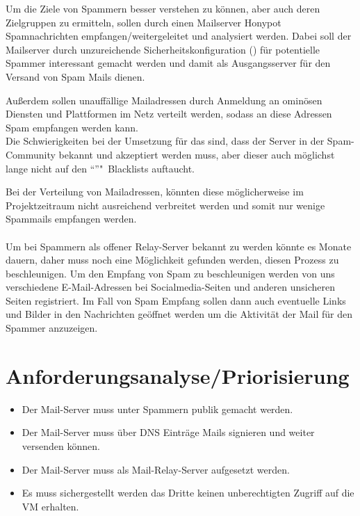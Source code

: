 \documentclass[a4paper,11pt,singlespacing]{article}
\begin{document}
	Um die Ziele von Spammern besser verstehen zu können, aber auch deren Zielgruppen zu ermitteln, sollen durch einen Mailserver Honypot Spamnachrichten empfangen/weitergeleitet und analysiert werden. 
	Dabei soll der Mailserver durch unzureichende Sicherheitskonfiguration () für potentielle Spammer interessant gemacht werden und damit als Ausgangsserver für den Versand von Spam Mails dienen.
	
	Außerdem sollen unauffällige Mailadressen durch Anmeldung an ominösen Diensten und Plattformen im Netz verteilt werden, sodass an diese Adressen Spam empfangen werden kann.
\\
	Die Schwierigkeiten bei der Umsetzung für das  sind, dass der Server in der Spam-Community bekannt und akzeptiert werden muss, aber dieser auch möglichst lange nicht auf den "`"'"~Blacklists auftaucht.
	
	Bei der Verteilung von Mailadressen, könnten diese möglicherweise im Projektzeitraum nicht ausreichend verbreitet werden und somit nur wenige Spammails empfangen werden.
\\\\
	Um bei Spammern als offener Relay-Server bekannt zu werden könnte es Monate dauern, daher muss noch eine Möglichkeit gefunden werden, diesen Prozess zu beschleunigen.
	Um den Empfang von Spam zu beschleunigen werden von uns verschiedene E-Mail-Adressen bei Socialmedia-Seiten und anderen unsicheren Seiten registriert.
	Im Fall von Spam Empfang sollen dann auch eventuelle Links und Bilder in den Nachrichten geöffnet werden um die Aktivität der Mail für den Spammer anzuzeigen.


\section{Anforderungsanalyse/Priorisierung}\label{sec:AnforderungsanalysePriorisierung}
	\begin{itemize}
	\item Der Mail-Server muss unter Spammern publik gemacht werden.
	\item Der Mail-Server muss über DNS Einträge Mails signieren und weiter versenden können.
	\item Der Mail-Server muss als Mail-Relay-Server aufgesetzt werden.
	\item Es muss sichergestellt werden das Dritte keinen unberechtigten Zugriff auf die VM erhalten.
	\end{itemize}
\end{document}
